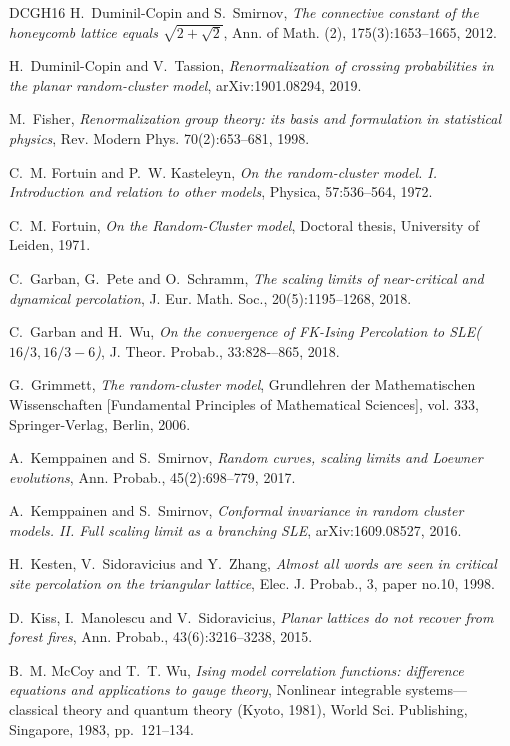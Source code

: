\documentclass[a4paper,oneside,11pt]{article}
\numberwithin{equation}{section}
\numberwithin{equation}{section}
\numberwithin{equation}{section}
\begin{document}
\begin{thebibliography}{DCGH{\etalchar{+}}16}
H.~{Duminil-Copin} and S.~Smirnov,
{\em The connective constant of the honeycomb lattice equals {$\sqrt{2+\sqrt{2}}$}},
Ann. of Math. (2), 175(3):1653--1665, 2012.

H.~Duminil-Copin and V.~Tassion, 
\emph{Renormalization of crossing probabilities in the planar random-cluster model}, 
arXiv:1901.08294, 2019.

M.~Fisher, 
{\em Renormalization group theory: its basis and formulation in statistical physics},
Rev. Modern Phys. 70(2):653--681, 1998.

C.~M. Fortuin and P.~W. Kasteleyn, 
\emph{On the random-cluster model. {I}. {I}ntroduction and relation to other models}, 
Physica, 57:536--564, 1972. 

C.~M. Fortuin, 
\emph{On the {R}andom-{C}luster model}, 
Doctoral thesis,  University of Leiden, 1971.

C.~Garban, G.~Pete and O.~Schramm, 
\emph{The scaling limits of near-critical and dynamical percolation}, 
J. Eur. Math. Soc., 20(5):1195--1268, 2018.

C.~Garban and H.~Wu,
{\em On the convergence of FK-Ising Percolation to SLE($16/3,16/3-6$)}, 
J. Theor. Probab., 33:828-–865, 2018.

G.~Grimmett, 
\emph{The random-cluster model}, 
Grundlehren der Mathematischen Wissenschaften [Fundamental Principles of Mathematical Sciences], vol. 333, Springer-Verlag, Berlin, 2006. 

A.~Kemppainen and S.~Smirnov, 
{\em Random curves, scaling limits and Loewner evolutions},     
Ann. Probab., 45(2):698--779, 2017. 

A.~Kemppainen and S.~Smirnov, 
{\em Conformal invariance in random cluster models. II. Full scaling limit as a branching SLE}, 
arXiv:1609.08527, 2016.

H.~Kesten, V.~Sidoravicius and Y.~Zhang, 
{\em Almost all words are seen in critical site percolation on the triangular lattice}, 
Elec. J. Probab., 3, paper no.10, 1998.

D.~Kiss, I.~Manolescu and V.~Sidoravicius, 
\emph{Planar lattices do not recover from forest fires}, 
Ann. Probab., 43(6):3216--3238, 2015.

B.~M. McCoy and T.~T. Wu, 
\emph{Ising model correlation functions: difference equations and applications to gauge theory}, 
Nonlinear integrable systems---classical theory and quantum theory ({K}yoto, 1981), World Sci. Publishing, Singapore, 1983, pp.~121--134. 


\end{thebibliography}
\end{document}
